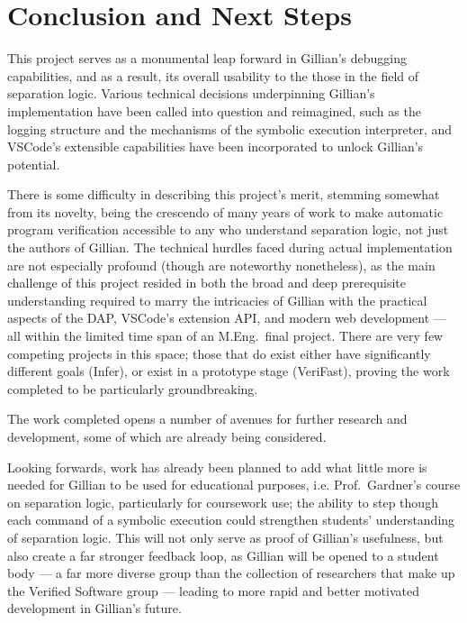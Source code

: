 
\chapter{Conclusion and Next Steps}\label{sec:conclusion}

This project serves as a monumental leap forward in Gillian's debugging
capabilities, and as a result, its overall usability to the those in the field
of separation logic. Various technical decisions underpinning Gillian's
implementation have been called into question and reimagined, such as the
logging structure and the mechanisms of the symbolic execution interpreter, and
VSCode's extensible capabilities have been incorporated to unlock Gillian's
potential.

There is some difficulty in describing this project's merit, stemming somewhat
from its novelty, being the crescendo of many years of work to make automatic
program verification accessible to any who understand separation logic, not just
the authors of Gillian. The technical hurdles faced during actual implementation
are not especially profound (though are noteworthy nonetheless), as the main
challenge of this project resided in both the broad and deep prerequisite
understanding required to marry the intricacies of Gillian with the practical
aspects of the DAP, VSCode's extension API, and modern web development --- all
within the limited time span of an M.Eng.\ final project. There are very few
competing projects in this space; those that do exist either have significantly
different goals (Infer), or exist in a prototype stage (VeriFast), proving the
work completed to be particularly groundbreaking.

The work completed opens a number of avenues for further research and
development, some of which are already being considered.

Looking forwards, work has already been planned to add what little more is
needed for Gillian to be used for educational purposes, i.e. Prof.\ Gardner's
course on separation logic, particularly for coursework use; the ability to step
though each command of a symbolic execution could strengthen students'
understanding of separation logic. This will not only serve as proof of
Gillian's usefulness, but also create a far stronger feedback loop, as Gillian
will be opened to a student body --- a far more diverse group than the
collection of researchers that make up the Verified Software group --- leading
to more rapid and better motivated development in Gillian's future.

